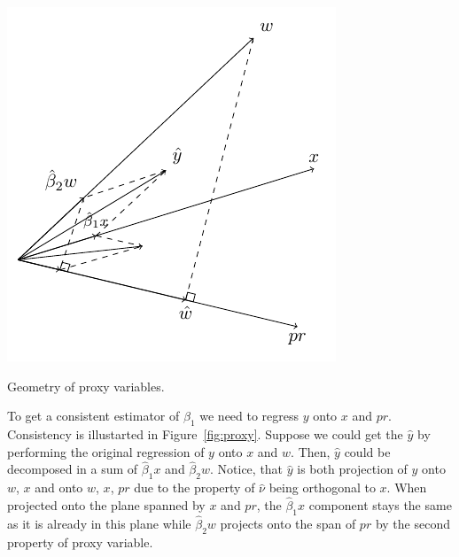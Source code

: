 \begin{marginfigure}
\includegraphics[scale=0.85]{figures/02_proxy.pdf}
\caption{Geometry of proxy variables. }
\label{fig:proxy}
\end{marginfigure}

To get a consistent estimator of $\beta_1$ we need to regress $y$ onto $x$ and $pr$.
Consistency is illustarted in Figure~\ref{fig:proxy}.
Suppose we could get the $\hat y$ by performing the original regression of
$y$ onto $x$ and $w$. Then, $\hat y$ could be decomposed in a sum of
$\hat \beta_1 x$ and $\hat \beta_2 w$.
Notice, that $\hat y$ is both projection of $y$ onto $w$, $x$ and
onto $w$, $x$, $pr$ due to the property of $\hat \nu$ being orthogonal to $x$.
When projected onto the plane spanned by $x$ and $pr$, the $\hat \beta_1 x$
component stays the same as it is already in this plane
while $\hat \beta_2 w$ projects onto the span of $pr$ by the second property of proxy variable.
